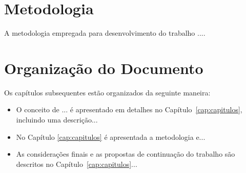 \section{Metodologia}
\label{sec:metodologia}

A metodologia empregada para desenvolvimento do trabalho ....




\section{Organização do Documento}
\label{sec:organizacao}

Os capítulos subsequentes estão organizados da seguinte maneira:

\begin{itemize}
    \item O conceito de ... é apresentado em detalhes no Capítulo~\ref{cap:capitulos}, incluindo uma descrição...

    \item No Capítulo \ref{cap:capitulos} é apresentada a metodologia e...

    \item As considerações finais e as propostas de continuação do trabalho são descritos no Capítulo~\ref{cap:capitulos}...
\end{itemize}

